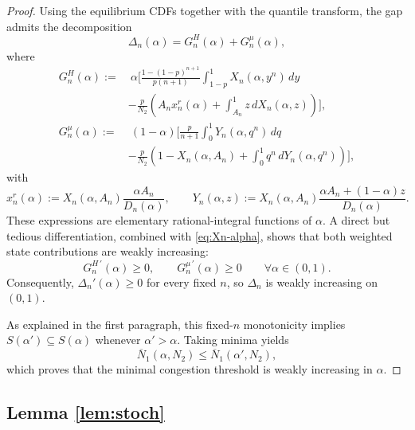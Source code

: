 \begin{proof}
\noindent Using the equilibrium CDFs together with the quantile transform, the gap admits the decomposition
\begin{equation*}
    \Delta_n(\alpha) = G_n^H(\alpha) + G_n^\mu(\alpha),
\end{equation*}
where
\begin{align*}
    G_n^H(\alpha)
    :=
    & \ \alpha \Bigg[
        \frac{1-(1-p)^{n+1}}{p(n+1)} \int_{1-p}^{1} X_n(\alpha,y^n)\,dy  \\
        & 
        - \frac{p}{N_2}\left(
            A_n x_n^r(\alpha) + \int_{A_n}^{1} z\,dX_n(\alpha,z)
        \right)
    \Bigg], \\[6pt]
    G_n^\mu(\alpha)
    :=
    & \ (1-\alpha) \Bigg[
        \frac{p}{n+1} \int_0^{1} Y_n(\alpha,q^n)\,dq  \\
        & 
        - \frac{p}{N_2}\left(
            1-X_n(\alpha,A_n) + \int_0^{1} q^n\,dY_n(\alpha,q^n)
        \right)
    \Bigg],
\end{align*}
with
\begin{equation*}
    x_n^r(\alpha) := X_n(\alpha,A_n)\frac{\alpha A_n}{D_n(\alpha)}, \qquad
    Y_n(\alpha,z) := X_n(\alpha,A_n)\frac{\alpha A_n + (1-\alpha)z}{D_n(\alpha)}.
\end{equation*}
These expressions are elementary rational-integral functions of $\alpha$. A direct but tedious differentiation, combined with \eqref{eq:Xn-alpha}, shows that both weighted state contributions are weakly increasing:
\begin{equation*}
    G_n^{H\,\prime}(\alpha) \geq 0, \qquad G_n^{\mu\,\prime}(\alpha) \geq 0 \qquad \forall \alpha \in (0,1).
\end{equation*}
Consequently, $\Delta_n'(\alpha) \geq 0$ for every fixed $n$, so $\Delta_n$ is weakly increasing on $(0,1)$.

\noindent As explained in the first paragraph, this fixed-$n$ monotonicity implies $S(\alpha') \subseteq S(\alpha)$ whenever $\alpha' > \alpha$. Taking minima yields
\begin{equation*}
    \overline{N}_1(\alpha, N_2) \leq \overline{N}_1(\alpha', N_2),
\end{equation*}
which proves that the minimal congestion threshold is weakly increasing in $\alpha$.
\end{proof}

\subsection*{Lemma \ref{lem:stoch}}

